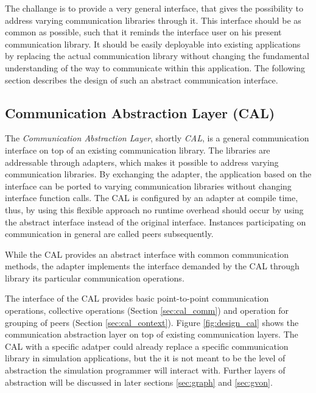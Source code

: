 The challange is to provide a very general interface, that gives the
possibility to address varying communication libraries through it.
This interface should be as common as possible, such that it
reminds the interface user on his present communication library.  It
should be easily deployable into existing applications by replacing
the actual communication library without changing the fundamental
understanding of the way to communicate within this application. The
following section describes the design of such an abstract
communication interface.


\subsection{Communication Abstraction Layer (CAL)}
\label{sec:cal}

The \textit{Communication Abstraction Layer}, shortly \textit{CAL}, is
a general communication interface on top of an existing communication
library. The libraries are addressable through
adapters, which makes it possible to address varying communication
libraries. By exchanging the adapter, the application based on the
interface can be ported to varying communication libraries without
changing interface function calls. The CAL is configured by an adapter
at compile time, thus, by using this flexible approach no runtime
overhead should occur by using the abstract interface instead of the
original interface. Instances participating on communication in general are
called peers subsequently.

While the CAL provides an abstract interface with common communication
methods, the adapter implements the interface demanded by the CAL
through library its particular communication operations.

The interface of the CAL provides basic point-to-point communication
operations, collective operations (Section \ref{sec:cal_comm}) and
operation for grouping of peers (Section \ref{sec:cal_context}).
Figure \ref{fig:design_cal} shows the communication abstraction layer
on top of existing communication layers.  The CAL with a specific
adatper could already replace a specific communication library in
simulation applications, but the it is not meant to be the level of
abstraction the simulation programmer will interact with. Further
layers of abstraction will be discussed in later sections
\ref{sec:graph} and \ref{sec:gvon}.

